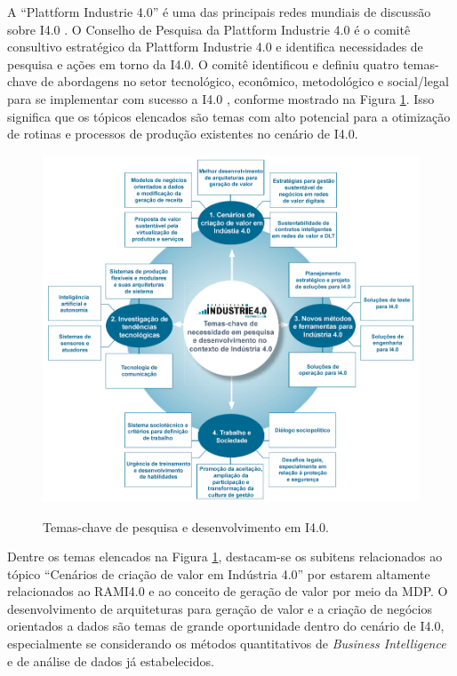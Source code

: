 \documentclass[
	12pt,				%
	oneside,			%
	a4paper,			%
	english,			%
	brazil				%
]{abntex2}
\begin{document}
	A ``Plattform Industrie 4.0'' é uma das principais redes mundiais de discussão sobre I4.0 \cite{kagermann2013recommendations, acatech2014plattform, germany2019plattform}. O Conselho de Pesquisa da Plattform Industrie 4.0 é o comitê consultivo estratégico da Plattform Industrie 4.0 e identifica necessidades de pesquisa e ações em torno da I4.0. O comitê identificou e definiu quatro temas-chave de abordagens no setor tecnológico, econômico, metodológico e social/legal para se implementar com sucesso a I4.0 \cite{hirsch-kreinsen2019keythemes}, conforme mostrado na Figura \ref{fig:keythemes-i4}. Isso significa que os tópicos elencados são temas com alto potencial para a otimização de rotinas e processos de produção existentes no cenário de I4.0.
	
	\begin{figure}[H]
		\centering
		\caption{Temas-chave de pesquisa e desenvolvimento em I4.0.}
		\includegraphics[width=1\textwidth]{keythemes-i4.png}
		\label{fig:keythemes-i4}
	\end{figure}

	Dentre os temas elencados na Figura \ref{fig:keythemes-i4}, destacam-se os subitens relacionados ao tópico ``Cenários de criação de valor em Indústria 4.0'' por estarem altamente relacionados ao RAMI4.0 e ao conceito de geração de valor por meio da MDP. O desenvolvimento de arquiteturas para geração de valor e a criação de negócios orientados a dados são temas de grande oportunidade dentro do cenário de I4.0, especialmente se considerando os métodos quantitativos de \textit{Business Intelligence} e de análise de dados já estabelecidos.
	
\end{document}
